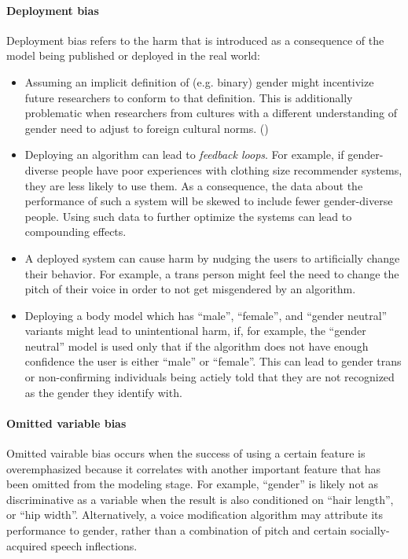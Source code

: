 \documentclass[nonacm,sigconf,review,balance=false]{acmart}
\begin{document}
\paragraph*{Deployment bias} Deployment bias refers to the harm that is introduced as a consequence of the model being published or deployed in the real world:
\begin{itemize}
    \item Assuming an implicit definition of (e.g. binary) gender might incentivize future researchers to conform to that definition. This is additionally problematic when researchers from cultures with a different understanding of gender need to adjust to foreign cultural norms. ()
    \item Deploying an algorithm can lead to \emph{feedback loops}. For example, if gender-diverse people have poor experiences with clothing size recommender systems, they are less likely to use them. As a consequence, the data about the performance of such a system will be skewed to include fewer gender-diverse people. Using such data to further optimize the systems can lead to compounding effects.
    \item A deployed system can cause harm by nudging the users to artificially change their behavior. For example, a trans person might feel the need to change the pitch of their voice in order to not get misgendered by an algorithm.
    \item Deploying a body model which has ``male'', ``female'', and ``gender neutral'' variants might lead to unintentional harm, if, for example, the ``gender neutral'' model is used only that if the algorithm does not have enough confidence the user is either ``male'' or ``female''. This can lead to gender trans or non-confirming individuals being actiely told that they are not recognized as the gender they identify with.
\end{itemize}

\paragraph*{Omitted variable bias} Omitted vairable bias occurs when the success of using a certain feature is overemphasized because it correlates with another important feature that has been omitted from the modeling stage. For example, ``gender'' is likely not as discriminative as a variable when the result is also conditioned on ``hair length'', or ``hip width''. Alternatively, a voice modification algorithm may attribute its performance to gender, rather than a combination of pitch and certain socially-acquired speech inflections. 
\end{document}
